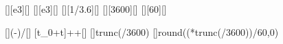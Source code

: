[\km][e3][\m]
[\km][e3][\m]
[\kmph][1/3.6][\mps]
[\hour][3600][\s]
[\minute][60][\s]

[]{(\sZX-\sMX)/\vMX}[\s]
[t_0+\Delta t]{\tMhX+\tMmX+\dtMX}[\s]
[]{trunc(\tZX/3600)}
[]{round((*trunc(\tZX/3600))/60,0)}
